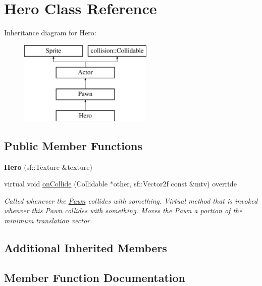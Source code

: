 \hypertarget{class_hero}{}\section{Hero Class Reference}
\label{class_hero}
Inheritance diagram for Hero\+:\begin{figure}[H]
\begin{center}
\leavevmode
\includegraphics[height=4.000000cm]{class_hero}
\end{center}
\end{figure}
\subsection*{Public Member Functions}
\begin{DoxyCompactItemize}
\item 
\hypertarget{class_hero_ad129609f1a95c795e196007069d43c40}{}{\bfseries Hero} (sf\+::\+Texture \&texture)\label{class_hero_ad129609f1a95c795e196007069d43c40}

\item 
virtual void \hyperlink{class_hero_a1f9b68a8daecbca5ca949764332c72d7}{on\+Collide} (Collidable $\ast$other, sf\+::\+Vector2f const \&mtv) override
\begin{DoxyCompactList}\small\item\em Called whenever the \hyperlink{class_pawn}{Pawn} collides with something. Virtual method that is invoked whenver this \hyperlink{class_pawn}{Pawn} collides with something. Moves the \hyperlink{class_pawn}{Pawn} a portion of the minimum translation vector. \end{DoxyCompactList}\end{DoxyCompactItemize}
\subsection*{Additional Inherited Members}


\subsection{Member Function Documentation}
\hypertarget{class_hero_a1f9b68a8daecbca5ca949764332c72d7}{}
